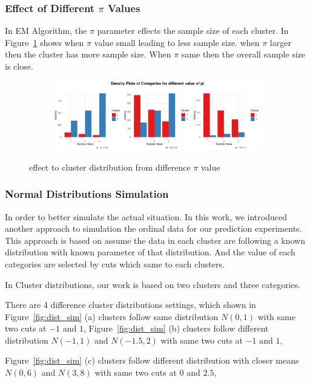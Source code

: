 \documentclass{article}
\begin{document}
\subsubsection*{Effect of Different $\pi$ Values}
In EM Algorithm, the $\pi$ parameter effects the sample size of each cluster. 
In Figure~\ref{fig:pi} shows when $\pi$ value small leading to less sample size.
when $\pi$ larger then the cluster has more sample size.
When $\pi$ same then the overall sample size is close.
\begin{figure}[ht]
  \centering
  \begin{subfigure}{1.0\textwidth}
      \centering
      \includegraphics[width=\textwidth]{images/para_sim/pi.png}
  \end{subfigure}
  \caption{effect to cluster distribution from difference $\pi$ value}
  \label{fig:pi}
\end{figure}

\subsubsection{Normal Distributions Simulation}

In order to better simulate the actual situation.
In this work, we introduced another approach to simulation the ordinal data 
for our prediction experiments. 
This approach is based on assume the data in each cluster are following 
a known distribution with known parameter of that distribution.
And the value of each categories are selected by cuts which same to each clusters.

In Cluster distributions, our work is based on two clusters and three categories.

There are 4 difference cluster distributions settings, which shown in 
Figure~\ref*{fig:dist_sim} (a) clusters follow same distribution $N(0, 1)$ 
with same two cuts at $-1$ and $1$,
Figure~\ref*{fig:dist_sim} (b) clusters follow different distribution $N(-1,1)$ and $N(-1.5,2)$
with same two cuts at $-1$ and $1$,

Figure~\ref*{fig:dist_sim} (c) clusters follow different distribution with closer means $N(0,6)$ and $N(3,8)$
with same two cuts at $0$ and $2.5$,
\end{document}
